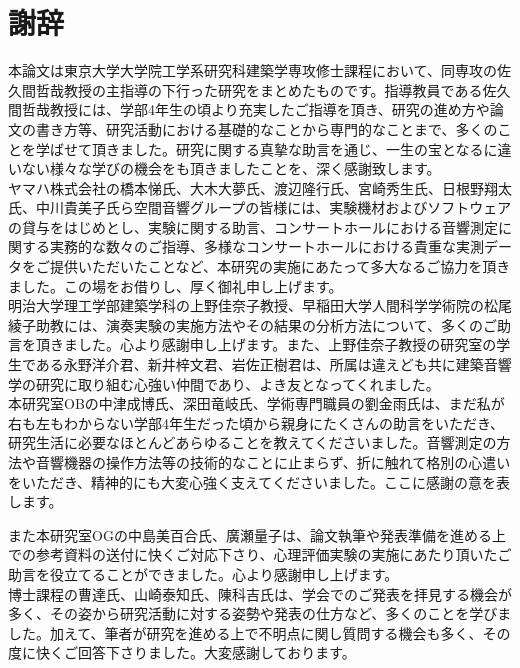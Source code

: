 \documentclass[11pt,a4j,dvipdfmx, twoside]{jreport}
\begin{document}

\chapter*{謝辞} %

本論文は東京大学大学院工学系研究科建築学専攻修士課程において、同専攻の佐久間哲哉教授の主指導の下行った研究をまとめたものです。指導教員である佐久間哲哉教授には、学部4年生の頃より充実したご指導を頂き、研究の進め方や論文の書き方等、研究活動における基礎的なことから専門的なことまで、多くのことを学ばせて頂きました。研究に関する真摯な助言を通じ、一生の宝となるに違いない様々な学びの機会をも頂きましたことを、深く感謝致します。
\\

ヤマハ株式会社の橋本悌氏、大木大夢氏、渡辺隆行氏、宮崎秀生氏、日根野翔太氏、中川貴美子氏ら空間音響グループの皆様には、実験機材およびソフトウェアの貸与をはじめとし、実験に関する助言、コンサートホールにおける音響測定に関する実務的な数々のご指導、多様なコンサートホールにおける貴重な実測データをご提供いただいたことなど、本研究の実施にあたって多大なるご協力を頂きました。この場をお借りし、厚く御礼申し上げます。
\\

明治大学理工学部建築学科の上野佳奈子教授、早稲田大学人間科学学術院の松尾綾子助教には、演奏実験の実施方法やその結果の分析方法について、多くのご助言を頂きました。心より感謝申し上げます。また、上野佳奈子教授の研究室の学生である永野洋介君、新井梓文君、岩佐正樹君は、所属は違えども共に建築音響学の研究に取り組む心強い仲間であり、よき友となってくれました。
\\

本研究室OBの中津成博氏、深田竜岐氏、学術専門職員の劉金雨氏は、まだ私が右も左もわからない学部4年生だった頃から親身にたくさんの助言をいただき、研究生活に必要なほとんどあらゆることを教えてくださいました。音響測定の方法や音響機器の操作方法等の技術的なことに止まらず、折に触れて格別の心遣いをいただき、精神的にも大変心強く支えてくださいました。ここに感謝の意を表します。

また本研究室OGの中島美百合氏、廣瀬量子は、論文執筆や発表準備を進める上での参考資料の送付に快くご対応下さり、心理評価実験の実施にあたり頂いたご助言を役立てることができました。心より感謝申し上げます。
\\

博士課程の曹達氏、山崎泰知氏、陳科吉氏は、学会でのご発表を拝見する機会が多く、その姿から研究活動に対する姿勢や発表の仕方など、多くのことを学びました。加えて、筆者が研究を進める上で不明点に関し質問する機会も多く、その度に快くご回答下さりました。大変感謝しております。
\\
\end{document}
